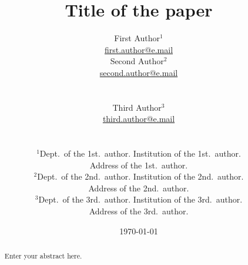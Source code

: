 \documentclass[10pt,twoside]{article}
\theoremstyle{remark}
\theoremstyle{definition}
\begin{document}
\title{Title of the paper}

\author{
\begin{minipage}[c]{0.3\linewidth}
\centering
First Author$^{1}$\\
\url{first.author@e.mail}
\end{minipage}
\begin{minipage}[c]{0.4\linewidth}
\centering
  Second Author$^{2}$\\
  \url{second.author@e.mail}
\end{minipage}\\ [0,3in]
\begin{minipage}[c]{0.4\linewidth}
\centering
  Third Author$^{3}$\\
  \url{third.author@e.mail}
\end{minipage}\\
\begin{minipage}[c]{0.9\linewidth}
\centering
\vspace{\baselineskip}\noindent
$^{1}$Dept.~of the 1st.~author. Institution of the 1st.~author.\\
  Address of the 1st.~author.\\
\vspace{0.75\baselineskip}
$^{2}$Dept.~of the 2nd.~author. Institution of the 2nd.~author.\\
  Address of the 2nd.~author.\\
\vspace{0.75\baselineskip}
$^{3}$Dept.~of the 3rd.~author. Institution of the 3rd.~author.\\
  Address of the 3rd.~author.\\
\vspace{0.75\baselineskip}
\end{minipage}}

\date{\today}
\maketitle

\begin{abstract}
Enter your abstract here.


\end{abstract}
\end{document}
